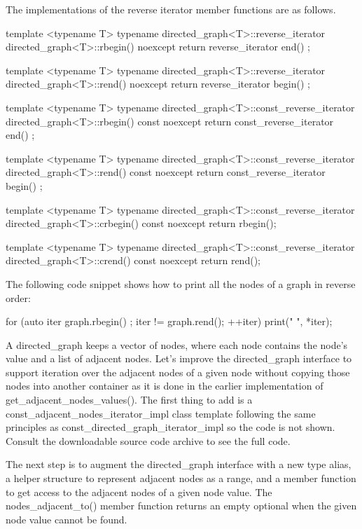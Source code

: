 The implementations of the reverse iterator member functions are as follows.

\begin{cpp}
template <typename T>
typename directed_graph<T>::reverse_iterator
    directed_graph<T>::rbegin() noexcept { return reverse_iterator { end() }; }

template <typename T>
typename directed_graph<T>::reverse_iterator
    directed_graph<T>::rend() noexcept { return reverse_iterator { begin() }; }

template <typename T>
typename directed_graph<T>::const_reverse_iterator
    directed_graph<T>::rbegin() const noexcept
{ return const_reverse_iterator { end() }; }

template <typename T>
typename directed_graph<T>::const_reverse_iterator
    directed_graph<T>::rend() const noexcept
{ return const_reverse_iterator { begin() }; }

template <typename T>
typename directed_graph<T>::const_reverse_iterator
    directed_graph<T>::crbegin() const noexcept { return rbegin(); }

template <typename T>
typename directed_graph<T>::const_reverse_iterator
    directed_graph<T>::crend() const noexcept { return rend(); }
\end{cpp}

The following code snippet shows how to print all the nodes of a graph in reverse order:

\begin{cpp}
for (auto iter { graph.rbegin() }; iter != graph.rend(); ++iter) {
    print("{} ", *iter);
}
\end{cpp}


A directed\_graph keeps a vector of nodes, where each node contains the node’s value and a list of adjacent nodes. Let’s improve the directed\_graph interface to support iteration over the adjacent nodes of a given node without copying those nodes into another container as it is done in the earlier implementation of get\_adjacent\_nodes\_values(). The first thing to add is a const\_adjacent\_nodes\_iterator\_impl class template following the same principles as const\_directed\_graph\_iterator\_impl so the code is not shown. Consult the downloadable source code archive to see the full code.

The next step is to augment the directed\_graph interface with a new type alias, a helper structure to represent adjacent nodes as a range, and a member function to get access to the adjacent nodes of a given node value. The nodes\_adjacent\_to() member function returns an empty optional when the given node value cannot be found.

